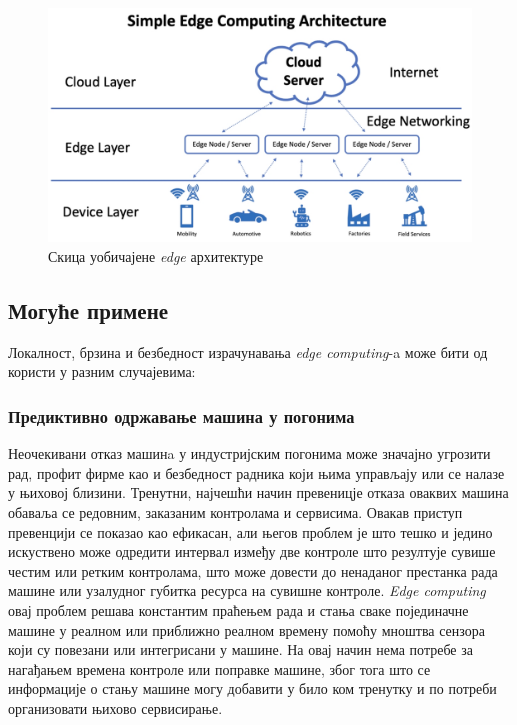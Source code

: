 \begin{figure}[H]
    \centering
    \includegraphics[width=1\textwidth]{images/edge_arch.jpg}
    \caption{Скица уобичајене \textit{edge} архитектуре}
    \label{fig:edge_arch}
\end{figure}

\subsection{Могуће примене}

Локалност, брзина и безбедност израчунавања \textit{edge computing}-a може бити од користи у разним случајевима:

    \subsubsection{Предиктивно одржавање машина у погонима} Неочекивани отказ машинa у индустријским погонима може значајно угрозити рад, профит фирме као и безбедност радника који њима управљају или се налазе у њиховој близини. Тренутни, најчешћи начин превеницје отказа оваквих машина обаваља се редовним, заказаним контролама и сервисима. Овакав приступ превенцији се показао као ефикасан, али његов проблем је што тешко и једино искуствено може одредити интервал између две контроле што резултује сувише честим или ретким контролама, што може довести до ненаданог престанка рада машине или узалудног губитка ресурса на сувишне контроле. \textit{Edge computing} овај проблем решава константим праћењем рада и стања сваке појединачне машине у реалном или приближно реалном времену помоћу мноштва сензора који су повезани или интегрисани у машине. На овај начин нема потребе за нагађањем времена контроле или поправке машине, због тога што се информације о стању машине могу добавити у било ком тренутку и по потреби организовати њихово сервисирање.

